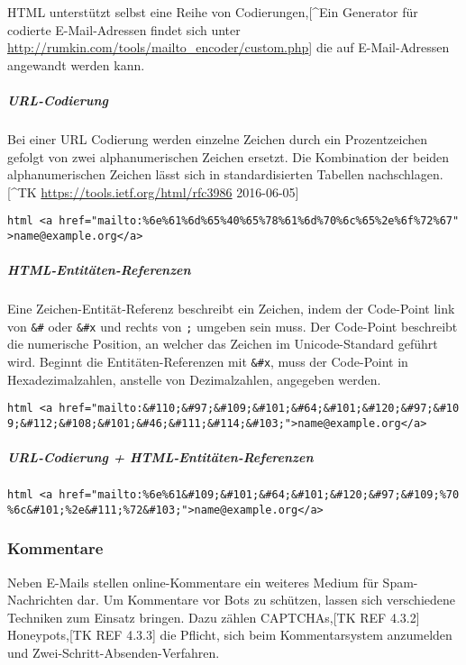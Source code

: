 HTML unterstützt selbst eine Reihe von Codierungen,{[}\^{}Ein Generator
für codierte E-Mail-Adressen findet sich unter
\url{http://rumkin.com/tools/mailto_encoder/custom.php}{]} die auf
E-Mail-Adressen angewandt werden kann.

\subparagraph{URL-Codierung}
\label{spar:url-codierung}

Bei einer URL Codierung werden einzelne Zeichen durch ein Prozentzeichen
gefolgt von zwei alphanumerischen Zeichen ersetzt. Die Kombination der
beiden alphanumerischen Zeichen lässt sich in standardisierten Tabellen
nachschlagen.{[}\^{}TK \url{https://tools.ietf.org/html/rfc3986}
2016-06-05{]}

\texttt{html\ \textless{}a\ href="mailto:\%6e\%61\%6d\%65\%40\%65\%78\%61\%6d\%70\%6c\%65\%2e\%6f\%72\%67"\textgreater{}name@example.org\textless{}/a\textgreater{}}

\subparagraph{HTML-Entitäten-Referenzen}
\label{spar:html-entitaeten-referenzen}

Eine Zeichen-Entität-Referenz beschreibt ein Zeichen, indem der
Code-Point link von \texttt{\&\#} oder \texttt{\&\#x} und rechts von
\texttt{;} umgeben sein muss. Der Code-Point beschreibt die numerische
Position, an welcher das Zeichen im Unicode-Standard geführt wird.
Beginnt die Entitäten-Referenzen mit \texttt{\&\#x}, muss der Code-Point
in Hexadezimalzahlen, anstelle von Dezimalzahlen, angegeben werden.

\texttt{html\ \textless{}a\ href="mailto:\&\#110;\&\#97;\&\#109;\&\#101;\&\#64;\&\#101;\&\#120;\&\#97;\&\#109;\&\#112;\&\#108;\&\#101;\&\#46;\&\#111;\&\#114;\&\#103;"\textgreater{}name@example.org\textless{}/a\textgreater{}}

\subparagraph{URL-Codierung + HTML-Entitäten-Referenzen}
\label{spar:url-codierung-html-entitaeten-referenzen}

\texttt{html\ \textless{}a\ href="mailto:\%6e\%61\&\#109;\&\#101;\&\#64;\&\#101;\&\#120;\&\#97;\&\#109;\%70\%6c\&\#101;\%2e\&\#111;\%72\&\#103;"\textgreater{}name@example.org\textless{}/a\textgreater{}}

\subsubsection{Kommentare}
\label{ssub:kommentare}

Neben E-Mails stellen online-Kommentare ein weiteres Medium für
Spam-Nachrichten dar. Um Kommentare vor Bots zu schützen, lassen sich
verschiedene Techniken zum Einsatz bringen. Dazu zählen CAPTCHAs,{[}TK
REF 4.3.2{]} Honeypots,{[}TK REF 4.3.3{]} die Pflicht, sich beim
Kommentarsystem anzumelden und Zwei-Schritt-Absenden-Verfahren.

